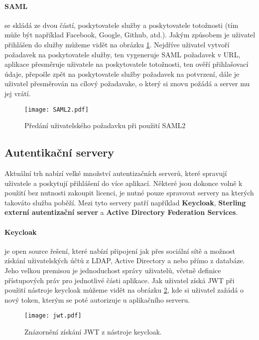 \paragraph{SAML} se skládá ze dvou částí, poskytovatele služby a poskytovatele totožnosti (tím může být například Facebook, Google, Github, atd.). Jakým způsobem je uživatel přihlášen do služby můžeme vidět na obrázku \ref{saml2}. Nejdříve uživatel vytvoří požadavek na poskytovatele služby, ten vygeneruje SAML požadavek v URL, aplikace přesměruje uživatele na poskytovatele totožnosti, ten ověří přihlašovací údaje, přepošle zpět na poskytovatele služby požadavek na potvrzení, dále je uživatel přesměrován na cílový požadavake, o který si znovu požádá a server mu jej vrátí. \cite{saml}
\begin{figure}[!htp]
\centering
\texttt{[image: SAML2.pdf]}
\caption{Předání uživatelského požadavku při použití SAML2}
\label{saml2}
\end{figure}

\subsection{Autentikační servery} \label{auth-server}
\par Aktuální trh nabízí velké množství autentizačních serverů, které spravují uživatele a poskytují přihlášení do více aplikací. Některé jsou dokonce volně k použití bez nutnosti zakoupit licenci, je nutné pouze spravovat servery na kterých takováto služba poběží. Mezi tyto servery patří například \textbf{Keycloak}, \textbf{Sterling externí autentizační server} a \textbf{Active Directory Federation Services}.

\paragraph{Keycloak} je open source řešení, které nabízí připojení jak přes sociální sítě a možnost získání uživatelských účtů z LDAP, Active Directory a nebo přímo z databáze. Jeho velkou premisou je jednoduchost správy uživatelů, včetně definice přístupových práv pro jednotlivé části aplikace. \cite{keycloak} Jak uživatel získá JWT při použití nástroje keycloak můžeme vidět na obrázku \ref{keycloak-jwt-fig}, kde si uživatel zažádá o nový token, kterým se poté autorizuje u aplikačního serveru.

\begin{figure}[htp]
\centering
\texttt{[image: jwt.pdf]}
\caption{Znázornění získání JWT z nástroje keycloak.}
\label{keycloak-jwt-fig}
\end{figure}

